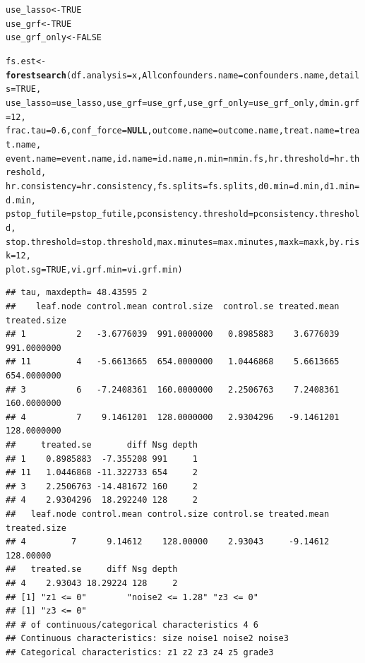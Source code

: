 \documentclass[smallextended]{svjour3}
\makeatletter
\newcommand{\hlnum}[1]{\textcolor[rgb]{0.686,0.059,0.569}{#1}}%
\newcommand{\hlstd}[1]{\textcolor[rgb]{0.345,0.345,0.345}{#1}}%
\newcommand{\hlkwa}[1]{\textcolor[rgb]{0.161,0.373,0.58}{\textbf{#1}}}%
\newcommand{\hlkwb}[1]{\textcolor[rgb]{0.69,0.353,0.396}{#1}}%
\newcommand{\hlkwc}[1]{\textcolor[rgb]{0.333,0.667,0.333}{#1}}%
\newcommand{\hlkwd}[1]{\textcolor[rgb]{0.737,0.353,0.396}{\textbf{#1}}}%
\newenvironment{kframe}{%
 \def\at@end@of@kframe{}%
 \ifinner\ifhmode%
  \def\at@end@of@kframe{\end{minipage}}%
  \begin{minipage}{\columnwidth}%
 \fi\fi%
 \def\FrameCommand##1{\hskip\@totalleftmargin \hskip-\fboxsep
 \colorbox{shadecolor}{##1}\hskip-\fboxsep
     \hskip-\linewidth \hskip-\@totalleftmargin \hskip\columnwidth}%
 \MakeFramed {\advance\hsize-\width
   \@totalleftmargin\z@ \linewidth\hsize
   \@setminipage}}%
 {\par\unskip\endMakeFramed%
 \at@end@of@kframe}
\newenvironment{knitrout}{}{} %
\makeatother
\begin{document}
\begin{knitrout}
\begin{kframe}
\begin{alltt}
\hlstd{use_lasso} \hlkwb{<-} \hlnum{TRUE}
\hlstd{use_grf} \hlkwb{<-} \hlnum{TRUE}
\hlstd{use_grf_only} \hlkwb{<-} \hlnum{FALSE}

\hlstd{fs.est} \hlkwb{<-} \hlkwd{forestsearch}\hlstd{(}\hlkwc{df.analysis} \hlstd{= x,} \hlkwc{Allconfounders.name} \hlstd{= confounders.name,} \hlkwc{details} \hlstd{=} \hlnum{TRUE}\hlstd{,}
    \hlkwc{use_lasso} \hlstd{= use_lasso,} \hlkwc{use_grf} \hlstd{= use_grf,} \hlkwc{use_grf_only} \hlstd{= use_grf_only,} \hlkwc{dmin.grf} \hlstd{=} \hlnum{12}\hlstd{,}
    \hlkwc{frac.tau} \hlstd{=} \hlnum{0.6}\hlstd{,} \hlkwc{conf_force} \hlstd{=} \hlkwa{NULL}\hlstd{,} \hlkwc{outcome.name} \hlstd{= outcome.name,} \hlkwc{treat.name} \hlstd{= treat.name,}
    \hlkwc{event.name} \hlstd{= event.name,} \hlkwc{id.name} \hlstd{= id.name,} \hlkwc{n.min} \hlstd{= nmin.fs,} \hlkwc{hr.threshold} \hlstd{= hr.threshold,}
    \hlkwc{hr.consistency} \hlstd{= hr.consistency,} \hlkwc{fs.splits} \hlstd{= fs.splits,} \hlkwc{d0.min} \hlstd{= d.min,} \hlkwc{d1.min} \hlstd{= d.min,}
    \hlkwc{pstop_futile} \hlstd{= pstop_futile,} \hlkwc{pconsistency.threshold} \hlstd{= pconsistency.threshold,}
    \hlkwc{stop.threshold} \hlstd{= stop.threshold,} \hlkwc{max.minutes} \hlstd{= max.minutes,} \hlkwc{maxk} \hlstd{= maxk,} \hlkwc{by.risk} \hlstd{=} \hlnum{12}\hlstd{,}
    \hlkwc{plot.sg} \hlstd{=} \hlnum{TRUE}\hlstd{,} \hlkwc{vi.grf.min} \hlstd{= vi.grf.min)}
\end{alltt}
\begin{verbatim}
## tau, maxdepth= 48.43595 2 
##    leaf.node control.mean control.size  control.se treated.mean treated.size
## 1          2   -3.6776039  991.0000000   0.8985883    3.6776039  991.0000000
## 11         4   -5.6613665  654.0000000   1.0446868    5.6613665  654.0000000
## 3          6   -7.2408361  160.0000000   2.2506763    7.2408361  160.0000000
## 4          7    9.1461201  128.0000000   2.9304296   -9.1461201  128.0000000
##     treated.se       diff Nsg depth
## 1    0.8985883  -7.355208 991     1
## 11   1.0446868 -11.322733 654     2
## 3    2.2506763 -14.481672 160     2
## 4    2.9304296  18.292240 128     2
##   leaf.node control.mean control.size control.se treated.mean treated.size
## 4         7      9.14612    128.00000    2.93043     -9.14612    128.00000
##   treated.se     diff Nsg depth
## 4    2.93043 18.29224 128     2
## [1] "z1 <= 0"        "noise2 <= 1.28" "z3 <= 0"       
## [1] "z3 <= 0"
## # of continuous/categorical characteristics 4 6 
## Continuous characteristics: size noise1 noise2 noise3 
## Categorical characteristics: z1 z2 z3 z4 z5 grade3 

\end{verbatim}
\end{kframe}
\end{knitrout}
\end{document}
